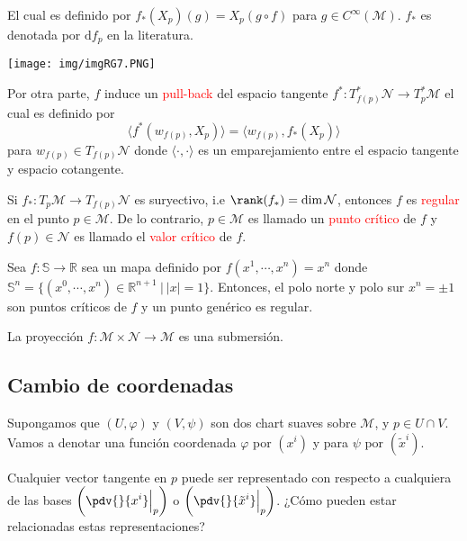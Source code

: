 \documentclass[../main]{subfiles}
\begin{document}
\begin{adjustwidth}{0pt}{-100pt}
El cual es definido por $f_{*}(X_p)(g)=X_p(g \circ f)$ para $g \in C^{\infty}(\mathcal{M})$. $f_*$ es denotada por $\mathrm{d}f_p$ en la literatura.
\begin{center}
    \texttt{[image: img/imgRG7.PNG]}
\end{center}

Por otra parte, $f$ induce un \textcolor{red}{pull-back} del espacio tangente $f^{*}: T^{*}_{f(p)}\mathcal{N} \rightarrow T^{*}_p \mathcal{M}$ el cual es definido por 
\begin{equation}
    \langle f^*(w_{f(p)}, X_p)\rangle = \langle w_{f(p)}, f_*(X_p)\rangle
\end{equation}
para $w_{f(p)} \in T_{f(p)}\mathcal{N}$ donde $\langle \cdot, \cdot \rangle$ es un emparejamiento entre el espacio tangente y espacio cotangente.

Si $f_*: T_p \mathcal{M}\rightarrow T_{f(p)}\mathcal{N}$ es suryectivo, i.e $\rank(f_*)=\dim \mathcal{N}$, entonces $f$ es \textcolor{red}{regular} en el punto $p \in \mathcal{M}$. De lo contrario, $p \in \mathcal{M}$ es llamado un \textcolor{red}{punto crítico} de $f$ y $f(p) \in \mathcal{N}$ es llamado el \textcolor{red}{valor crítico} de $f$.

\ejemplo{} Sea $f: \mathbb{S} \rightarrow \mathbb{R}$ sea un mapa definido por $f(x^1, \cdots, x^n)=x^n$ donde $\mathbb{S}^n=\{(x^0, \cdots, x^n) \in \mathbb{R}^{n+1} \ | \ |x|=1\}$. Entonces, el polo norte y polo sur $x^n=\pm 1$ son puntos críticos de $f$ y un punto genérico es regular. 


\ejemplo{} La proyección $f: \mathcal{M} \times \mathcal{N} \rightarrow \mathcal{M}$ es una submersión.

\subsection{Cambio de coordenadas}
Supongamos que $(U, \varphi)$ y $(V, \psi)$ son dos chart suaves sobre $\mathcal{M}$, y $p \in U\cap V$. Vamos a denotar una función coordenada $\varphi$ por $(x^{i})$ y para $\psi$ por $(\tilde{x}^{i})$.

Cualquier vector tangente en $p$ puede ser representado con respecto a cualquiera de las bases $\displaystyle \left(\pdv{}{x^{i}}\Big{|}_p\right)$ o $\displaystyle \left(\pdv{}{\tilde{x}^{i}}\Big{|}_p\right)$. ¿Cómo pueden estar relacionadas estas representaciones?


\end{adjustwidth}
\end{document}
